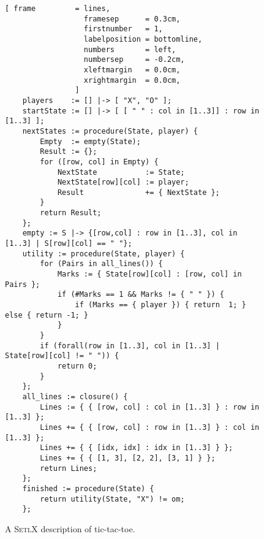 \begin{figure}[!ht]
\centering
\begin{Verbatim}[ frame         = lines, 
                  framesep      = 0.3cm, 
                  firstnumber   = 1,
                  labelposition = bottomline,
                  numbers       = left,
                  numbersep     = -0.2cm,
                  xleftmargin   = 0.0cm,
                  xrightmargin  = 0.0cm,
                ]
    players    := [] |-> [ "X", "O" ];  
    startState := [] |-> [ [ " " : col in [1..3]] : row in [1..3] ];
    nextStates := procedure(State, player) {
        Empty  := empty(State);
        Result := {};
        for ([row, col] in Empty) {
            NextState           := State;
            NextState[row][col] := player;
            Result              += { NextState };
        }
        return Result;
    };
    empty := S |-> {[row,col] : row in [1..3], col in [1..3] | S[row][col] == " "};
    utility := procedure(State, player) {
        for (Pairs in all_lines()) {
            Marks := { State[row][col] : [row, col] in Pairs };
            if (#Marks == 1 && Marks != { " " }) {
                if (Marks == { player }) { return  1; } else { return -1; }
            }
        }
        if (forall(row in [1..3], col in [1..3] | State[row][col] != " ")) {
            return 0;   
        }
    };
    all_lines := closure() {
        Lines := { { [row, col] : col in [1..3] } : row in [1..3] };
        Lines += { { [row, col] : row in [1..3] } : col in [1..3] };
        Lines += { { [idx, idx] : idx in [1..3] } };
        Lines += { { [1, 3], [2, 2], [3, 1] } };
        return Lines;
    };
    finished := procedure(State) {
        return utility(State, "X") != om;
    };
\end{Verbatim}
\vspace*{-0.3cm}
\caption{A \textsc{SetlX} description of tic-tac-toe.}
\label{fig:ttt.stlx}
\end{figure}
 

